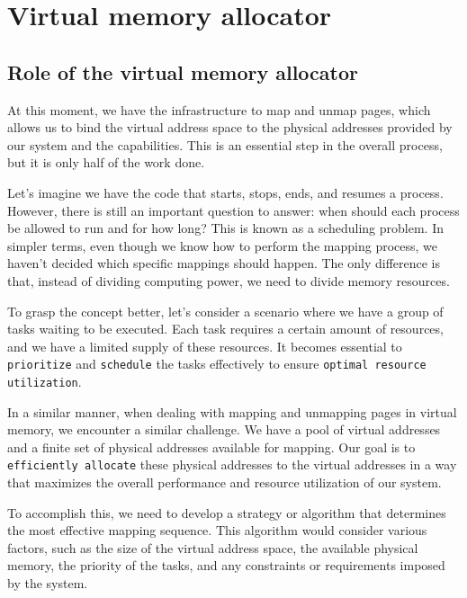 \section{Virtual memory allocator}

\subsection{Role of the virtual memory allocator}

At this moment, we have the infrastructure to map and unmap pages, which allows us to bind the virtual address space to the physical addresses provided by our system and the capabilities. This is an essential step in the overall process, but it is only half of the work done.

Let's imagine we have the code that starts, stops, ends, and resumes a process. However, there is still an important question to answer: when should each process be allowed to run and for how long? This is known as a scheduling problem. In simpler terms, even though we know how to perform the mapping process, we haven't decided which specific mappings should happen. The only difference is that, instead of dividing computing power, we need to divide memory resources.

To grasp the concept better, let's consider a scenario where we have a group of tasks waiting to be executed. Each task requires a certain amount of resources, and we have a limited supply of these resources. It becomes essential to \texttt{prioritize} and \texttt{schedule} the tasks effectively to ensure \texttt{optimal resource utilization}.

In a similar manner, when dealing with mapping and unmapping pages in virtual memory, we encounter a similar challenge. We have a pool of virtual addresses and a finite set of physical addresses available for mapping. Our goal is to \texttt{efficiently allocate} these physical addresses to the virtual addresses in a way that maximizes the overall performance and resource utilization of our system.

To accomplish this, we need to develop a strategy or algorithm that determines the most effective mapping sequence. This algorithm would consider various factors, such as the size of the virtual address space, the available physical memory, the priority of the tasks, and any constraints or requirements imposed by the system.


